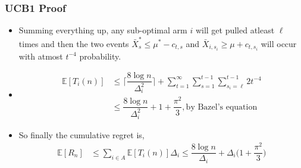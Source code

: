 \begin{frame}
\frametitle{UCB1 Proof}
\begin{itemize}
\item<1-> Summing everything up, any sub-optimal arm $i$ will get pulled atleast $\ell$ times and then the two events $\bar{X}^{*}_{s}\leq \mu^* - c_{t,s}$ and $\bar{X}_{i,s_i}\geq \mu + c_{t,s_i}$ will occur with atmost $t^{-4}$ probability.
\item<2-> \begin{align*}
\mathbb{E}[T_{i}(n)]&\leq \bigg\lceil \dfrac{8\log n}{\Delta_{i}^{2}}\bigg\rceil + \sum_{t=1}^{\infty}\sum_{s=1}^{t-1}\sum_{s_i =\ell}^{t-1}2t^{-4}\\
&\leq \dfrac{8\log n}{\Delta_{i}^{2}} +1 + \dfrac{\pi^{2}}{3}, \text{by Bazel's equation}
\end{align*}
\item<3-> So finally the cumulative regret is,
\begin{align*}
\mathbb{E}[R_n]&\leq \sum_{i\in A}\mathbb{E}[T_i (n)]\Delta_i
\leq \dfrac{8\log n}{\Delta_{i}} + \Delta_{i}\bigg(1 + \dfrac{\pi^{2}}{3}\bigg)
\end{align*}
\end{itemize}
\end{frame}